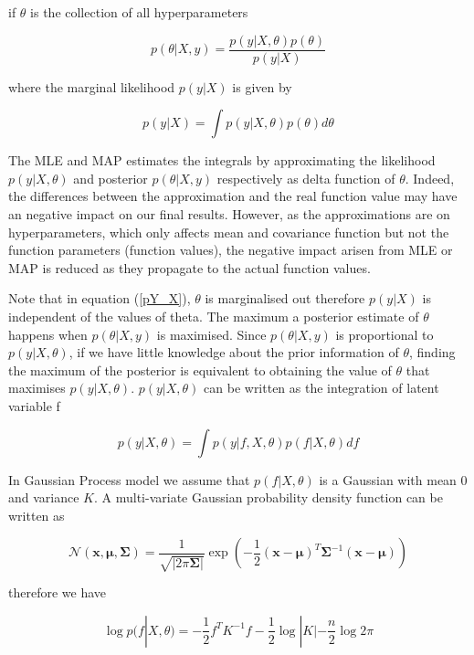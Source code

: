 \documentclass[11pt]{report}
\numberwithin{equation}{chapter}
\begin{document}
\begin{spacing}{2}
if $\theta$ is the collection of all hyperparameters

\[p(\theta|X,y) = \frac{p(y|X,\theta)p(\theta)}{p(y|X)}\]

where the marginal likelihood $p(y|X)$ is given by 

\begin{equation}
\label{pY_X}
p(y|X) = \int{p(y|X,\theta)p(\theta)}d\theta
\end{equation}

The MLE and MAP estimates the integrals by approximating the likelihood $p(y|X,\theta)$ and posterior $p(\theta|X,y)$ respectively as delta function of $\theta$. Indeed, the differences between the approximation and the real function value may have an negative impact on our final results. However, as the approximations are on hyperparameters, which only affects mean and covariance function but not the function parameters (function values), the negative impact arisen from MLE or MAP is reduced as they propagate to the actual function values.

Note that in equation (\ref{pY_X}), $\theta$ is marginalised out therefore $p(y|X)$ is independent of the values of theta. The maximum a posterior estimate of $\theta$ happens when $p(\theta|X,y)$ is maximised. Since $p(\theta|X,y)$ is proportional to $p(y|X,\theta)$, if we have little knowledge about the prior information of $\theta$, finding the maximum of the posterior is equivalent to obtaining the value of $\theta$ that maximises $p(y|X,\theta)$. $p(y|X,\theta)$ can be written as the integration of latent variable f

\begin{equation}
\label{theta_likelihood}
p(y|X,\theta) = \int{p(y|f,X,\theta)p(f|X,\theta)}df
\end{equation}

In Gaussian Process model we assume that $p(f|X,\theta)$ is a Gaussian with mean 0 and variance $K$. A multi-variate Gaussian probability density function can be written as 

\[\mathcal{N}(\mathbf{x},\mathbf{\mu},\mathbf{\Sigma}) = \frac{1}{\sqrt{|2\pi\mathbf{\Sigma}|}}\operatorname{exp}\left(-\frac{1}{2}(\mathbf{x} - \mathbf{\mu})^T\mathbf{\Sigma}^{-1}(\mathbf{x} - \mathbf{\mu})\right)\]

therefore we have

\begin{equation}
\label{f_posterior}
\operatorname{log}p(f|X,\theta) = -\frac{1}{2}f^TK^{-1}f-\frac{1}{2}\operatorname{log}|K| - \frac{n}{2}\operatorname{log}2\pi
\end{equation}


\end{spacing}
\end{document}
